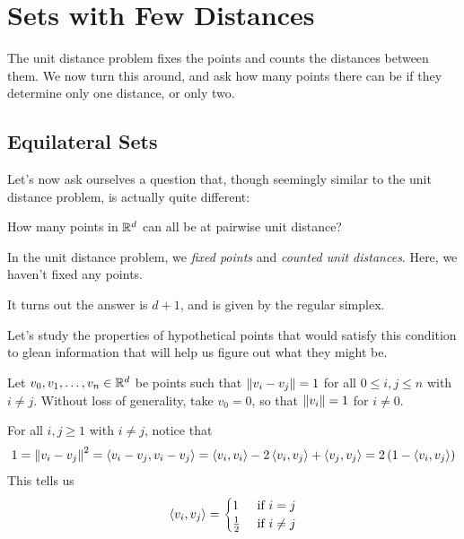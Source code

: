 \section{Sets with Few Distances}

The unit distance problem fixes the points and counts the distances between them. We now turn this around, and ask how many points there can be if they determine only one distance, or only two.

\subsection{Equilateral Sets}

Let's now ask ourselves a question that, though seemingly similar to the unit distance problem, is actually quite different:
\begin{center}
    How many points in $\mathbb{R}^d$ can all be at pairwise unit distance?
\end{center}
In the unit distance problem, we \textit{fixed points} and \textit{counted unit distances}. Here, we haven't fixed any points.

It turns out the answer is $d + 1$, and is given by the regular simplex.

Let's study the properties of hypothetical points that would satisfy this condition to glean information that will help us figure out what they might be.

Let $v_0, v_1, \ldots, v_n \in \mathbb{R}^d$ be points such that $\left\lVert v_i - v_j \right\rVert = 1$ for all $0 \leq i, j \leq n$ with $i \neq j$. Without loss of generality, take $v_0 = 0$, so that $\left\lVert v_i \right\rVert = 1$ for $i \neq 0$.

For all $i, j \geq 1$ with $i \neq j$, notice that
\begin{align*}
    1 = \left\lVert v_i - v_j \right\rVert^2 = \left\langle v_i - v_j, v_i - v_j \right\rangle = \left\langle v_i, v_i \right\rangle - 2\left\langle v_i, v_j \right\rangle + \left\langle v_j, v_j \right\rangle = 2\left( 1 - \left\langle v_i, v_j \right\rangle \right)
\end{align*}
This tells us
\begin{align*}
    \left\langle v_i, v_j \right\rangle =
    \begin{cases}
        1 & \text{ if } i = j \\
        \frac{1}{2} & \text{ if } i \neq j
    \end{cases}
\end{align*}

